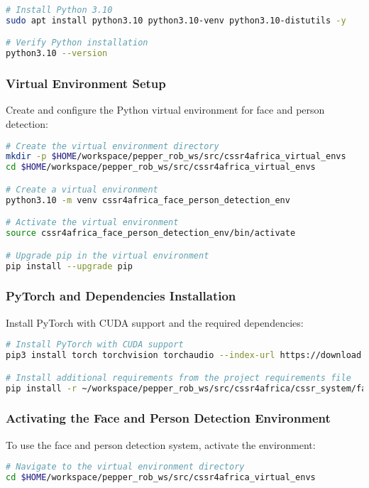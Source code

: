 \documentclass{CSSRforAfrica}
\begin{document}
{\begin{lstlisting}[style=withoutNumbering, language=bash]
# Install Python 3.10
sudo apt install python3.10 python3.10-venv python3.10-distutils -y

# Verify Python installation
python3.10 --version
\end{lstlisting}

\subsubsection*{Virtual Environment Setup}
Create and configure the Python virtual environment for face and person detection:
\begin{lstlisting}[style=withoutNumbering, language=bash]
# Create the virtual environment directory
mkdir -p $HOME/workspace/pepper_rob_ws/src/cssr4africa_virtual_envs
cd $HOME/workspace/pepper_rob_ws/src/cssr4africa_virtual_envs

# Create a virtual environment
python3.10 -m venv cssr4africa_face_person_detection_env

# Activate the virtual environment
source cssr4africa_face_person_detection_env/bin/activate

# Upgrade pip in the virtual environment
pip install --upgrade pip
\end{lstlisting}

\subsubsection*{PyTorch and Dependencies Installation}
Install PyTorch with CUDA support and the required dependencies:
\begin{lstlisting}[style=withoutNumbering, language=bash]
# Install PyTorch with CUDA support
pip3 install torch torchvision torchaudio --index-url https://download.pytorch.org/whl/cu118

# Install additional requirements from the project requirements file
pip install -r ~/workspace/pepper_rob_ws/src/cssr4africa/cssr_system/face_detection/face_detection_requirements_x86.txt
\end{lstlisting}

\subsubsection*{Activating the Face and Person Detection Environment}
To use the face and person detection system, activate the environment:
\begin{lstlisting}[style=withoutNumbering, language=bash]
# Navigate to the virtual environment directory
cd $HOME/workspace/pepper_rob_ws/src/cssr4africa_virtual_envs


\end{lstlisting}}
\end{document}
